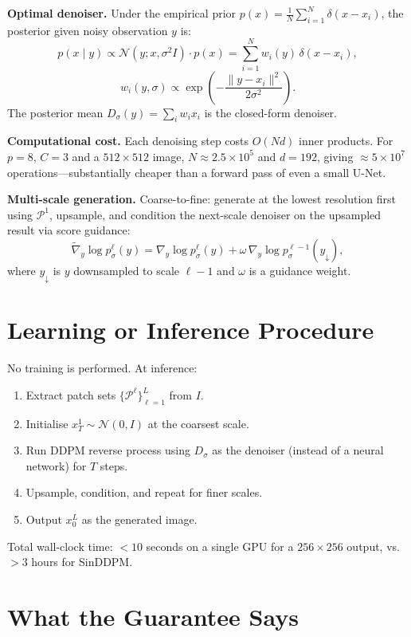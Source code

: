 \documentclass[10pt,twocolumn]{article}
\begin{document}
\textbf{Optimal denoiser.}
Under the empirical prior $p(x) = \frac{1}{N}\sum_{i=1}^N \delta(x - x_i)$,
the posterior given noisy observation $y$ is:
\[
p(x \mid y) \propto \mathcal{N}(y; x, \sigma^2 I)\cdot p(x)
= \sum_{i=1}^N w_i(y)\,\delta(x-x_i),
\]
\[
w_i(y,\sigma) \propto \exp\!\left(-\frac{\|y - x_i\|^2}{2\sigma^2}\right).
\]
The posterior mean $D_\sigma(y) = \sum_i w_i x_i$ is the closed-form denoiser.

\textbf{Computational cost.}
Each denoising step costs $O(N d)$ inner products. For $p=8$, $C=3$
and a $512\times512$ image, $N\approx2.5\times10^5$ and $d=192$,
giving $\approx5\times10^7$ operations---substantially cheaper than a
forward pass of even a small U-Net.

\textbf{Multi-scale generation.}
Coarse-to-fine: generate at the lowest resolution first using
$\mathcal{P}^1$, upsample, and condition the next-scale denoiser on the
upsampled result via score guidance:
\[
\tilde\nabla_y \log p_\sigma^\ell(y) =
\nabla_y\log p_\sigma^\ell(y) + \omega\,\nabla_y\log p_\sigma^{\ell-1}(y_\downarrow),
\]
where $y_\downarrow$ is $y$ downsampled to scale $\ell{-}1$ and $\omega$
is a guidance weight.

\section{Learning or Inference Procedure}

No training is performed. At inference:
\begin{enumerate}[itemsep=2pt,parsep=0pt]
  \item Extract patch sets $\{\mathcal{P}^\ell\}_{\ell=1}^{L}$ from $I$.
  \item Initialise $x_T^1 \sim \mathcal{N}(0,I)$ at the coarsest scale.
  \item Run DDPM reverse process using $D_\sigma$ as the denoiser (instead
    of a neural network) for $T$ steps.
  \item Upsample, condition, and repeat for finer scales.
  \item Output $x_0^L$ as the generated image.
\end{enumerate}
Total wall-clock time: $<10$ seconds on a single GPU for a $256\times256$
output, vs.\ $>3$ hours for SinDDPM.

\section{What the Guarantee Says}
\end{document}
